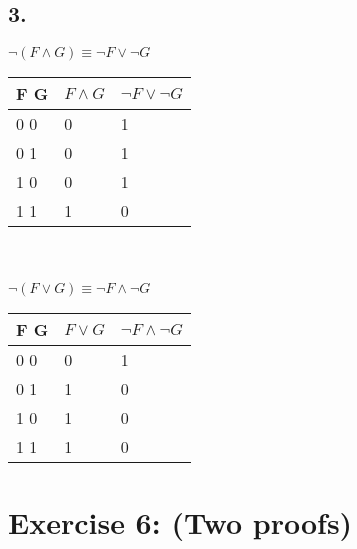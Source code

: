 \documentclass[12pt]{article}
\begin{document}
\subsection*{3.}
$\neg (F \land G) \equiv \neg F \lor \neg G$\\
\begin{tabular}{  l | l | l }
	F G & $F \land G$ & $\neg F \lor \neg G$  \\ \hline
	0 0 & 0 & 1  \\
	0 1 & 0 & 1  \\
	1 0 & 0 & 1  \\
	1 1 & 1 & 0  \\
\end{tabular}\\\\
$\neg (F \lor G) \equiv \neg F \land \neg G$\\
\begin{tabular}{  l | l | l }
	F G & $F \lor G$ & $\neg F \land \neg G$  \\ \hline
	0 0 & 0 & 1 \\
	0 1 & 1 & 0  \\
	1 0 & 1 & 0  \\
	1 1 & 1 & 0  \\
\end{tabular}

\section*{Exercise 6: (Two proofs)}
\end{document}

